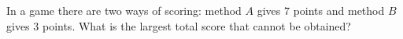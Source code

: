 In a game there are two ways of scoring: method $A$ gives $7$ points and method $B$ gives $3$ points. What is the largest total score that cannot be obtained?
